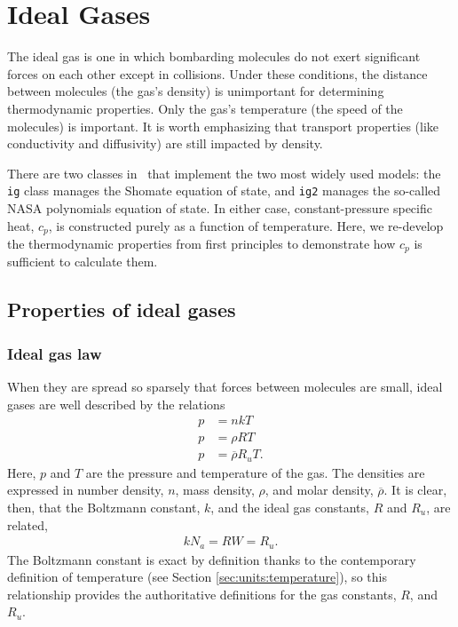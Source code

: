 \chapter{Ideal Gases}\label{ch:ig}

The ideal gas is one in which bombarding molecules do not exert significant forces on each other except in collisions.  Under these conditions, the distance between molecules (the gas's density) is unimportant for determining thermodynamic properties.  Only the gas's temperature (the speed of the molecules) is important.  It is worth emphasizing that transport properties (like conductivity and diffusivity) are still impacted by density.

There are two classes in \PM\ that implement the two most widely used models: the \verb|ig| class manages the Shomate equation of state, and \verb|ig2| manages the so-called NASA polynomials equation of state.  In either case, constant-pressure specific heat, $c_p$, is constructed purely as a function of temperature.  Here, we re-develop the thermodynamic properties from first principles to demonstrate how $c_p$ is sufficient to calculate them.

\section{Properties of ideal gases}\label{sec:ig:properties}

\subsection{Ideal gas law}\label{sec:ig:iglaw}

When they are spread so sparsely that forces between molecules are small, ideal gases are well described by the relations
\begin{subequations}
\begin{align}
p &= n k T\label{eqn:ig:k}\\
p &= \rho R T\label{eqn:ig:r}\\
p &= \overline{\rho} R_u T\label{eqn:ig:ru}.
\end{align}
\end{subequations}
Here, $p$ and $T$ are the pressure and temperature of the gas.  The densities are expressed in number density, $n$, mass density, $\rho$, and molar density, $\overline{\rho}$.  It is clear, then, that the Boltzmann constant, $k$, and the ideal gas constants, $R$ and $R_u$, are related,
\begin{align}
k N_a = R W = R_u.
\end{align}
The Boltzmann constant is exact by definition thanks to the contemporary definition of temperature (see Section \ref{sec:units:temperature}), so this relationship provides the authoritative definitions for the gas constants, $R$, and $R_u$.

